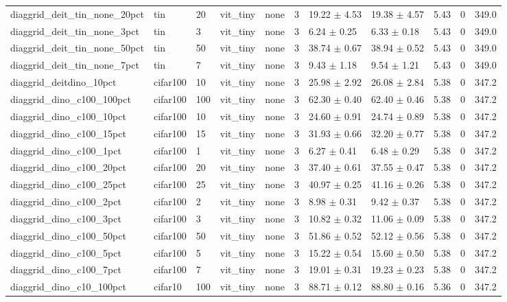 \begin{tabular}{lllllllllll}
diaggrid_deit_tin_none_20pct & tin & 20 & vit_tiny & none & 3 & 19.22 $\pm$ 4.53 & 19.38 $\pm$ 4.57 & 5.43 & 0 & 349.0 \\
diaggrid_deit_tin_none_3pct & tin & 3 & vit_tiny & none & 3 & 6.24 $\pm$ 0.25 & 6.33 $\pm$ 0.18 & 5.43 & 0 & 349.0 \\
diaggrid_deit_tin_none_50pct & tin & 50 & vit_tiny & none & 3 & 38.74 $\pm$ 0.67 & 38.94 $\pm$ 0.52 & 5.43 & 0 & 349.0 \\
diaggrid_deit_tin_none_7pct & tin & 7 & vit_tiny & none & 3 & 9.43 $\pm$ 1.18 & 9.54 $\pm$ 1.21 & 5.43 & 0 & 349.0 \\
diaggrid_deitdino_10pct & cifar100 & 10 & vit_tiny & none & 3 & 25.98 $\pm$ 2.92 & 26.08 $\pm$ 2.84 & 5.38 & 0 & 347.2 \\
diaggrid_dino_c100_100pct & cifar100 & 100 & vit_tiny & none & 3 & 62.30 $\pm$ 0.40 & 62.40 $\pm$ 0.46 & 5.38 & 0 & 347.2 \\
diaggrid_dino_c100_10pct & cifar100 & 10 & vit_tiny & none & 3 & 24.60 $\pm$ 0.91 & 24.74 $\pm$ 0.89 & 5.38 & 0 & 347.2 \\
diaggrid_dino_c100_15pct & cifar100 & 15 & vit_tiny & none & 3 & 31.93 $\pm$ 0.66 & 32.20 $\pm$ 0.77 & 5.38 & 0 & 347.2 \\
diaggrid_dino_c100_1pct & cifar100 & 1 & vit_tiny & none & 3 & 6.27 $\pm$ 0.41 & 6.48 $\pm$ 0.29 & 5.38 & 0 & 347.2 \\
diaggrid_dino_c100_20pct & cifar100 & 20 & vit_tiny & none & 3 & 37.40 $\pm$ 0.61 & 37.55 $\pm$ 0.47 & 5.38 & 0 & 347.2 \\
diaggrid_dino_c100_25pct & cifar100 & 25 & vit_tiny & none & 3 & 40.97 $\pm$ 0.25 & 41.16 $\pm$ 0.26 & 5.38 & 0 & 347.2 \\
diaggrid_dino_c100_2pct & cifar100 & 2 & vit_tiny & none & 3 & 8.98 $\pm$ 0.31 & 9.42 $\pm$ 0.37 & 5.38 & 0 & 347.2 \\
diaggrid_dino_c100_3pct & cifar100 & 3 & vit_tiny & none & 3 & 10.82 $\pm$ 0.32 & 11.06 $\pm$ 0.09 & 5.38 & 0 & 347.2 \\
diaggrid_dino_c100_50pct & cifar100 & 50 & vit_tiny & none & 3 & 51.86 $\pm$ 0.52 & 52.12 $\pm$ 0.56 & 5.38 & 0 & 347.2 \\
diaggrid_dino_c100_5pct & cifar100 & 5 & vit_tiny & none & 3 & 15.22 $\pm$ 0.54 & 15.60 $\pm$ 0.50 & 5.38 & 0 & 347.2 \\
diaggrid_dino_c100_7pct & cifar100 & 7 & vit_tiny & none & 3 & 19.01 $\pm$ 0.31 & 19.23 $\pm$ 0.23 & 5.38 & 0 & 347.2 \\
diaggrid_dino_c10_100pct & cifar10 & 100 & vit_tiny & none & 3 & 88.71 $\pm$ 0.12 & 88.80 $\pm$ 0.16 & 5.36 & 0 & 347.2 \\

\end{tabular}
